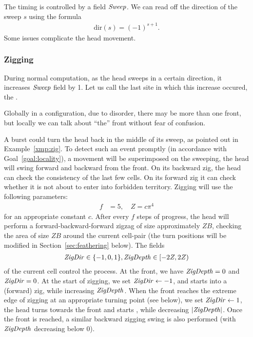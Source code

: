 \documentclass[11pt]{memoir}
\theoremstyle{definition} %
\newcommand{\fld}[1]{\ensuremath{\textit{#1\/}}}
\def\B{B}
\newcommand{\f}{f}
\newcommand{\passno}{\pi}
\newcommand{\Z}{Z}
\newcommand{\Sweep}{\fld{Sweep}}
\newcommand{\ZigDepth}{\fld{ZigDepth}}
\newcommand{\ZigDir}{\fld{ZigDir}}
\newcommand{\dir}{\mathrm{dir}}
\begin{document}
The timing is controlled by a field \( \Sweep \).
We can read off the direction of the sweep \( s \) using the formula
     \begin{align}\label{eq:sweep-dir}
       \dir(s)=(-1)^{s + 1}.
     \end{align}
Some issues complicate the head movement.

\subsubsection{Zigging}\label{sec:zigging}

\begin{definition}[Front]\label{def:front}
  During normal computation, as the head sweeps in a certain direction, it increases \( \Sweep \) field by 1.
Let us call the last site in which this increase occured, the .
\end{definition}
Globally in a configuration, due to disorder, there may be more than one front, but locally
we can talk about ``the'' front without fear of confusion.

A burst could turn the head back in the middle of its sweep, as pointed out in Example~\ref{xmp:zig}.
To detect such an event promptly (in accordance with Goal~\ref{goal:locality}),
a  movement will be superimposed on the sweeping, the head will swing forward and backward
from the front.
On its backward zig, the head can check the consistency of the last few cells.
On its forward zig it can check whether it is not about to enter into forbidden territory.
Zigging will use the following parameters:
\begin{align}\label{eq:ZDef}
  \f &= 5, \quad \Z = c \passno^{4}       
\end{align}
for an appropriate constant \( c \). %
After every \( \f \) steps of progress, the head will perform a forward-backward-forward
zigzag of size approximately \( \Z\B \), checking the area of size \( \Z\B \) around the current
cell-pair (the turn positions will be modified in Section~\ref{sec:feathering} below).
The fields
\begin{align*}
\ZigDir\in\{-1,0,1\}, \ZigDepth\in\lint{-2\Z}{2\Z}
\end{align*}
of the current cell control the process.
At the front, we have \( \ZigDepth=0 \) and \( \ZigDir=0 \).
At the start of zigging, we set \( \ZigDir\gets -1 \), and starts  into a (forward) zig,
while increasing \( \ZigDepth \).
When the front reaches the extreme edge of zigging at an appropriate turning point (see below),
we set \( \ZigDir\gets 1 \),
the head turns towards the front and starts , while decreasing \( |\ZigDepth| \).
Once the front is reached, a similar backward zigging swing is also
performed (with \( \ZigDepth \) decreasing below 0).
\end{document}
